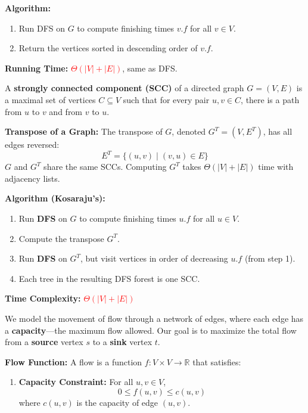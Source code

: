 \documentclass[a4paper,landscape]{article}
\newcommand{\timecomplexity}[1]{\textcolor{red}{#1}}
\begin{document}
\begin{multicols}{7}
\textbf{Algorithm:}
\begin{enumerate}[noitemsep, topsep=0pt]
    \item Run DFS on $G$ to compute finishing times $v.f$ for all $v \in V$.
    \item Return the vertices sorted in descending order of $v.f$.
\end{enumerate}

\textbf{Running Time:} \timecomplexity{$\Theta(|V| + |E|)$}, same as DFS.
\endtcolorbox

\tcolorbox[mybox={Strongly Connected Components}]
A \textbf{strongly connected component (SCC)} of a directed graph $G = (V, E)$ is a maximal set of vertices $C \subseteq V$ such that for every pair $u, v \in C$, there is a path from $u$ to $v$ and from $v$ to $u$.

\textbf{Transpose of a Graph:} The transpose of $G$, denoted $G^T = (V, E^T)$, has all edges reversed:
\[
E^T = \{(u, v) \mid (v, u) \in E\}
\]
$G$ and $G^T$ share the same SCCs. Computing $G^T$ takes $\Theta(|V| + |E|)$ time with adjacency lists.

\textbf{Algorithm (Kosaraju's):}
\begin{enumerate}[noitemsep, topsep=0pt]
    \item Run \textbf{DFS} on $G$ to compute finishing times $u.f$ for all $u \in V$.
    \item Compute the transpose $G^T$.
    \item Run \textbf{DFS} on $G^T$, but visit vertices in order of decreasing $u.f$ (from step 1).
    \item Each tree in the resulting DFS forest is one SCC.
\end{enumerate}

\textbf{Time Complexity:} \timecomplexity{\(\Theta(|V| + |E|)\)}
\endtcolorbox

\tcolorbox[mybox={Flow Network}]
We model the movement of flow through a network of edges, where each edge has a \textbf{capacity}—the maximum flow allowed. Our goal is to maximize the total flow from a \textbf{source} vertex $s$ to a \textbf{sink} vertex $t$.

\textbf{Flow Function:} A flow is a function $f : V \times V \to \mathbb{R}$ that satisfies:

\begin{enumerate}[noitemsep, topsep=0pt]
    \item \textbf{Capacity Constraint:} For all $u, v \in V$,
    \[
    0 \leq f(u, v) \leq c(u, v)
    \]
    where $c(u, v)$ is the capacity of edge $(u, v)$.
    

\end{enumerate}
\end{multicols}
\end{document}
